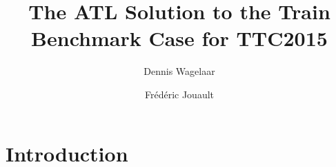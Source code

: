 \documentclass[submission,copyright,creativecommons]{eptcs}
\title{The {ATL} Solution to the Train Benchmark Case for {TTC2015}}
\author{Dennis Wagelaar
\institute{HealthConnect\\
Vilvoorde, Belgium}
\email{dennis.wagelaar@healthconnect.be}
\and
Fr\'{e}d\'{e}ric Jouault
\institute{ESEO-Tech\\
Angers, France}
\email{Frederic.Jouault@eseo.fr}
}
\begin{document}
\maketitle

\begin{abstract}
\end{abstract}

\section{Introduction}




\end{document}
